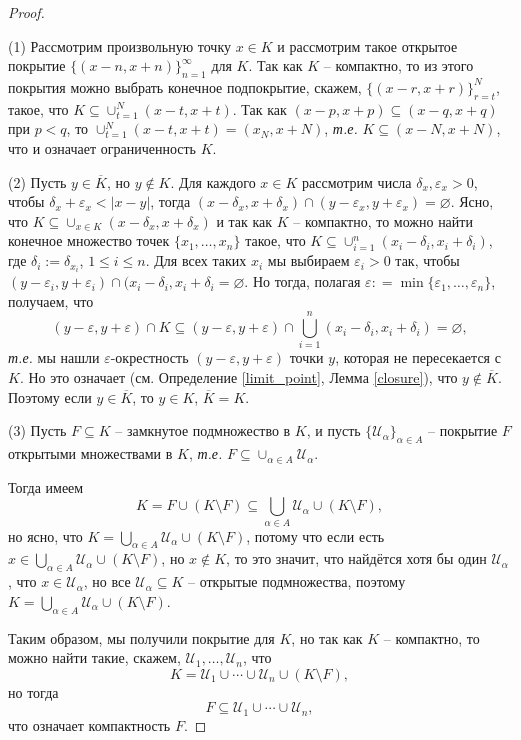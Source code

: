 \begin{proof}~

(1)  Рассмотрим произвольную точку $x\in K$ и рассмотрим такое открытое покрытие $\{(x-n,x+n)\}_{n=1}^\infty$ для $K$. Так как $K$ -- компактно, то из этого покрытия можно выбрать конечное подпокрытие, скажем, $\{ (x-r,x+r) \}_{r=t}^N$, такое, что $K \subseteq \cup_{t=1}^N  (x-t, x+t)$. Так как $(x-p,x+p) \subseteq (x-q,x+q)$ при $p<q$, то $\cup_{t=1}^N  (x-t, x+t) = (x_N, x+N)$, \textit{т.е.} $K \subseteq (x-N, x+N)$, что и означает ограниченность $K.$

(2) Пусть $y \in \overline{K}$, но $y \notin K$. Для каждого $x\in K$ рассмотрим числа $\delta_x, \varepsilon_x >0$, чтобы $\delta_x + \varepsilon_x < |x-y|$, тогда $(x-\delta_x, x+\delta_x) \cap (y-\varepsilon_x, y+\varepsilon_x) = \varnothing.$ Ясно, что $K \subseteq \cup_{x \in K} (x-\delta_x, x+\delta_x)$ и так как $K$ -- компактно, то можно найти конечное множество точек $\{x_1,\ldots, x_n\}$ такое, что $K \subseteq \cup_{i=1}^n (x_i-\delta_i, x_i+\delta_i)$, где $\delta_i := \delta_{x_i}$, $1\le i \le n.$ Для всех таких $x_i$ мы выбираем $\varepsilon_i>0$ так, чтобы $(y-\varepsilon_i, y+\varepsilon_i) \cap (x_i-\delta_i, x_i+\delta_i = \varnothing$. Но тогда, полагая $\varepsilon: = \min \{\varepsilon_1, \ldots, \varepsilon_n\}$, получаем, что
\[
  (y-\varepsilon, y+\varepsilon) \cap K \subseteq (y-\varepsilon, y+\varepsilon) \cap \bigcup_{i=1}^n (x_i - \delta_i, x_i+ \delta_i) = \varnothing,
\]
\textit{т.е.} мы нашли $\varepsilon$-окрестность $(y-\varepsilon, y+\varepsilon)$ точки $y$, которая не пересекается с $K$. Но это означает (см. Определение \ref{limit_point}, Лемма \ref{closure}), что $y \notin \overline{K}$.  Поэтому если $y\in \overline{K}$, то $y \in K$, \ie $\overline{K} = K.$



(3) Пусть $F \subseteq K$ -- замкнутое подмножество в $K$, и пусть $\{\mathscr{U}_\alpha\}_{\alpha \in A}$ -- покрытие $F$ открытыми множествами в $K$, \textit{т.е.} $F \subseteq \cup_{\alpha \in A} \mathscr{U}_\alpha$.

Тогда имеем
\[
  K = F \cup (K \setminus F) \subseteq \bigcup_{\alpha \in A} \mathscr{U}_\alpha \cup (K \setminus F),
\]
но ясно, что $K = \bigcup_{\alpha \in A} \mathscr{U}_\alpha \cup (K \setminus F)$, потому что если есть $x \in \bigcup_{\alpha \in A} \mathscr{U}_\alpha \cup (K \setminus F)$, но $x \notin 
K$, то это значит, что найдётся хотя бы один $\mathscr{U}_\alpha$, что $x \in \mathscr{U}_\alpha$, но все $\mathscr{U}_\alpha \subseteq K$ -- открытые подмножества, поэтому $K = \bigcup_{\alpha \in A} \mathscr{U}_\alpha \cup (K \setminus F).$

Таким образом, мы получили покрытие для $K$, но так как $K$ -- компактно, то можно найти такие, скажем, $\mathscr{U}_1, \ldots, \mathscr{U}_n$, что 
\[
 K = \mathscr{U}_1 \cup \cdots \cup \mathscr{U}_n \cup (K \setminus F),
\]
но тогда 
\[
 F \subseteq \mathscr{U}_1 \cup \cdots \cup \mathscr{U}_n,
\]
что означает компактность $F.$
\end{proof}

